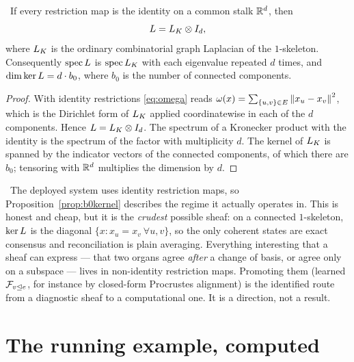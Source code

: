 \begin{proposition}\label{prop:b0kernel}
\Proved\ If every restriction map is the identity on a common stalk
$\mathbb{R}^{d}$, then
\[
  L=L_{K}\otimes I_d,
\]
where $L_{K}$ is the ordinary combinatorial graph Laplacian of the
$1$-skeleton. Consequently $\operatorname{spec}L$ is
$\operatorname{spec}L_K$ with each eigenvalue repeated $d$ times, and
$\dim\ker L=d\cdot b_0$, where $b_0$ is the number of connected
components.
\end{proposition}
\begin{proof}
With identity restrictions \eqref{eq:omega} reads
$\omega(x)=\sum_{\{u,v\}\in E}\left\lVert x_u-x_v \right\rVert^2$, which is the
Dirichlet form of $L_K$ applied coordinatewise in each of the $d$
components. Hence $L=L_K\otimes I_d$. The spectrum of a Kronecker
product with the identity is the spectrum of the factor with multiplicity
$d$. The kernel of $L_K$ is spanned by the indicator vectors of the
connected components, of which there are $b_0$; tensoring with $\mathbb{R}^{d}$
multiplies the dimension by $d$.
\end{proof}

\begin{hon}\Hon
\Implemented\ The deployed system uses identity restriction maps, so
Proposition~\ref{prop:b0kernel} describes the regime it actually
operates in. This is honest and cheap, but it is the \emph{crudest}
possible sheaf: on a connected $1$-skeleton, $\ker L$ is the diagonal
$\{x:x_u=x_v\ \forall u,v\}$, so the only coherent states are exact
consensus and reconciliation is plain averaging. Everything interesting
that a sheaf can express --- that two organs agree \emph{after} a
change of basis, or agree only on a subspace --- lives in non-identity
restriction maps. Promoting them (learned $\mathcal{F}_{v\trianglelefteq e}$, for
instance by closed-form Procrustes alignment) is the identified route
from a diagnostic sheaf to a computational one. It is a direction, not a
result.
\end{hon}

\section{The running example, computed}

